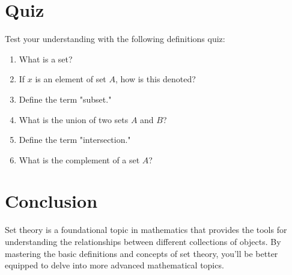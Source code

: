 \documentclass{article}
\begin{document}
\section{Quiz}

Test your understanding with the following definitions quiz:

\begin{enumerate}
    \item What is a set?
    \item If $x$ is an element of set $A$, how is this denoted?
    \item Define the term "subset."
    \item What is the union of two sets $A$ and $B$?
    \item Define the term "intersection."
    \item What is the complement of a set $A$?
\end{enumerate}

\section{Conclusion}

Set theory is a foundational topic in mathematics that provides the tools for understanding the relationships between different collections of objects. By mastering the basic definitions and concepts of set theory, you'll be better equipped to delve into more advanced mathematical topics.
\end{document}

